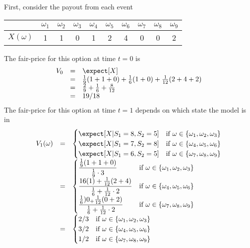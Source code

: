 \documentclass[11pt,a4paper]{article}
\begin{document}
  First, consider the payout from each event
  \begin{center}
    \begin{tabular}{c|ccccccccc}
      &$\omega_1$&$\omega_2$&$\omega_3$&$\omega_4$&$\omega_5$&$\omega_6$&$\omega_7$&$\omega_8$&$\omega_9$\\\hline
      $X(\omega)$&1&1&0&1&2&4&0&0&2
    \end{tabular}
  \end{center}
  The fair-price for this option at time $t=0$ is
  \[\begin{array}{rcl}
    V_0&=&\expect[X]\\
    &=&\frac19(1+1+0)+\frac16(1+0)+\frac1{12}(2+4+2)\\
    &=&\frac29+\frac16+\frac8{12}\\
    &=&19/18
  \end{array}\]
  The fair-price for this option at time $t=1$ depends on which state the model is in
  \[\begin{array}{rcl}
    V_1(\omega)&=&\begin{cases}
        \expect[X|S_1=8,S_2=5]&\text{if }\omega\in\{\omega_1,\omega_2,\omega_3\}\\
        \expect[X|S_1=7,S_2=8]&\text{if }\omega\in\{\omega_4,\omega_5,\omega_6\}\\
        \expect[X|S_1=6,S_2=5]&\text{if }\omega\in\{\omega_7,\omega_8,\omega_9\}
    \end{cases}\\
    &=&\begin{cases}
        \dfrac{\frac19(1+1+0)}{\frac19\cdot3}&\text{if }\omega\in\{\omega_1,\omega_2,\omega_3\}\\
        \dfrac{16(1)+\frac1{12}(2+4)}{\frac16+\frac{1}{12}\cdot2}&\text{if }\omega\in\{\omega_4,\omega_5,\omega_6\}\\
        \dfrac{\frac16)0_+\frac1{12}(0+2)}{\frac16+\frac1{12}\cdot2}&\text{if }\omega\in\{\omega_7,\omega_8,\omega_9\}
    \end{cases}\\
    &=&\begin{cases}
        2/3&\text{if }\omega\in\{\omega_1,\omega_2,\omega_3\}\\
        3/2&\text{if }\omega\in\{\omega_4,\omega_5,\omega_6\}\\
        1/2&\text{if }\omega\in\{\omega_7,\omega_8,\omega_9\}
    \end{cases}\\
  \end{array}\]
\end{document}
